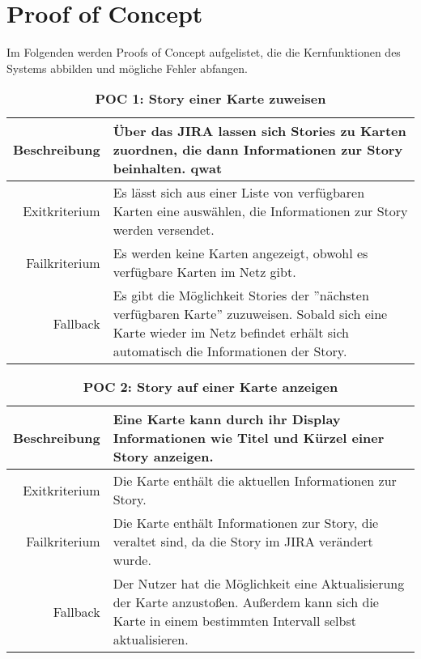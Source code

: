 \documentclass[12pt,titlepage]{scrartcl}
\begin{document}
	\section{Proof of Concept}
Im Folgenden werden Proofs of Concept aufgelistet, die die Kernfunktionen des Systems abbilden und mögliche Fehler abfangen.

\begin{table}[H]
\centering
\caption{\textbf{POC 1: Story einer Karte zuweisen}}
\label{poc1}
\begin{tabularx}{\linewidth}{|r|X|}
\hline
Beschreibung  & Über das JIRA lassen sich Stories zu Karten zuordnen, die dann Informationen zur Story beinhalten. qwat                                  \\ \hline
Exitkriterium & Es lässt sich aus einer Liste von verfügbaren Karten eine auswählen, die Informationen zur Story werden versendet. \\ \hline
Failkriterium & Es werden keine Karten angezeigt, obwohl es verfügbare Karten im Netz gibt. \\ \hline
Fallback      & Es gibt die Möglichkeit Stories der ''nächsten verfügbaren Karte'' zuzuweisen. Sobald sich eine Karte wieder im Netz befindet erhält sich automatisch die Informationen der Story. \\ \hline
\end{tabularx}
\end{table}

\begin{table}[H]
\centering
\caption{\textbf{POC 2: Story auf einer Karte anzeigen}}
\label{poc2}
\begin{tabularx}{\linewidth}{|r|X|}
\hline
Beschreibung  & Eine Karte kann durch ihr Display Informationen wie Titel und Kürzel einer Story anzeigen. \\ \hline
Exitkriterium & Die Karte enthält die aktuellen Informationen zur Story. \\ \hline
Failkriterium & Die Karte enthält Informationen zur Story, die veraltet sind, da die Story im JIRA verändert wurde.
 \\ \hline
Fallback      & Der Nutzer hat die Möglichkeit eine Aktualisierung der Karte anzustoßen. Außerdem kann sich die Karte in einem bestimmten Intervall selbst aktualisieren.
 \\ \hline
\end{tabularx}
\end{table}
\end{document}
